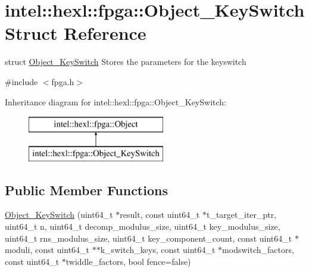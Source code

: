 \hypertarget{structintel_1_1hexl_1_1fpga_1_1Object__KeySwitch}{\section{intel\-:\-:hexl\-:\-:fpga\-:\-:Object\-\_\-\-Key\-Switch Struct Reference}
\label{structintel_1_1hexl_1_1fpga_1_1Object__KeySwitch}
}


struct \hyperlink{structintel_1_1hexl_1_1fpga_1_1Object__KeySwitch}{Object\-\_\-\-Key\-Switch} Stores the parameters for the keyswitch  




{\ttfamily \#include $<$fpga.\-h$>$}

Inheritance diagram for intel\-:\-:hexl\-:\-:fpga\-:\-:Object\-\_\-\-Key\-Switch\-:\begin{figure}[H]
\begin{center}
\leavevmode
\includegraphics[height=2.000000cm]{structintel_1_1hexl_1_1fpga_1_1Object__KeySwitch}
\end{center}
\end{figure}
\subsection*{Public Member Functions}
\begin{DoxyCompactItemize}
\item 
\hyperlink{structintel_1_1hexl_1_1fpga_1_1Object__KeySwitch_a323050d96e7cb1710632b1088c11bf0c}{Object\-\_\-\-Key\-Switch} (uint64\-\_\-t $\ast$result, const uint64\-\_\-t $\ast$t\-\_\-target\-\_\-iter\-\_\-ptr, uint64\-\_\-t n, uint64\-\_\-t decomp\-\_\-modulus\-\_\-size, uint64\-\_\-t key\-\_\-modulus\-\_\-size, uint64\-\_\-t rns\-\_\-modulus\-\_\-size, uint64\-\_\-t key\-\_\-component\-\_\-count, const uint64\-\_\-t $\ast$moduli, const uint64\-\_\-t $\ast$$\ast$k\-\_\-switch\-\_\-keys, const uint64\-\_\-t $\ast$modswitch\-\_\-factors, const uint64\-\_\-t $\ast$twiddle\-\_\-factors, bool fence=false)
\end{DoxyCompactItemize}
